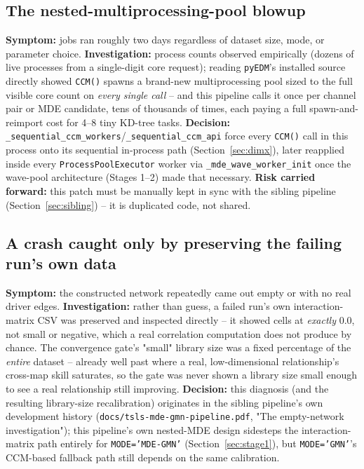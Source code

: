 \documentclass[11pt]{article}
\begin{document}
\subsection{The nested-multiprocessing-pool blowup}
\label{sec:history-pool}
\textbf{Symptom:} jobs ran roughly two days regardless of dataset size, mode, or parameter choice. \textbf{Investigation:} process counts observed empirically (dozens of live processes from a single-digit core request); reading \texttt{pyEDM}'s installed source directly showed \texttt{CCM()} spawns a brand-new multiprocessing pool sized to the full visible core count on \emph{every single call} -- and this pipeline calls it once per channel pair or MDE candidate, tens of thousands of times, each paying a full spawn-and-reimport cost for 4--8 tiny KD-tree tasks. \textbf{Decision:} \texttt{\_sequential\_ccm\_workers}/\texttt{\_sequential\_ccm\_api} force every \texttt{CCM()} call in this process onto its sequential in-process path (Section~\ref{sec:dimx}), later reapplied inside every \texttt{ProcessPoolExecutor} worker via \texttt{\_mde\_wave\_worker\_init} once the wave-pool architecture (Stages 1--2) made that necessary. \textbf{Risk carried forward:} this patch must be manually kept in sync with the sibling pipeline (Section~\ref{sec:sibling}) -- it is duplicated code, not shared.

\subsection{A crash caught only by preserving the failing run's own data}
\textbf{Symptom:} the constructed network repeatedly came out empty or with no real driver edges. \textbf{Investigation:} rather than guess, a failed run's own interaction-matrix CSV was preserved and inspected directly -- it showed cells at \emph{exactly} 0.0, not small or negative, which a real correlation computation does not produce by chance. The convergence gate's "small" library size was a fixed percentage of the \emph{entire} dataset -- already well past where a real, low-dimensional relationship's cross-map skill saturates, so the gate was never shown a library size small enough to see a real relationship still improving. \textbf{Decision:} this diagnosis (and the resulting library-size recalibration) originates in the sibling pipeline's own development history (\texttt{docs/tsls-mde-gmn-pipeline.pdf}, "The empty-network investigation"); this pipeline's own nested-MDE design sidesteps the interaction-matrix path entirely for \texttt{MODE='MDE-GMN'} (Section~\ref{sec:stage1}), but \texttt{MODE='GMN'}'s CCM-based fallback path still depends on the same calibration.
\end{document}
